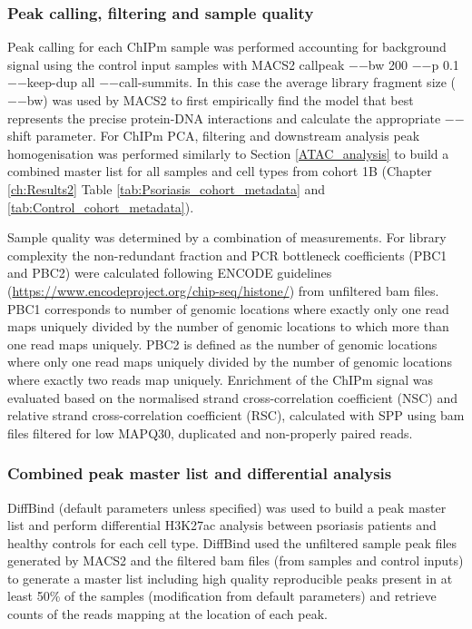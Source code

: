 \subsubsection{Peak calling, filtering and sample quality}
\label{ChIP_qc}
Peak calling for each ChIPm sample was performed accounting for background signal using the control input samples with MACS2 callpeak $-$$-$bw 200 $-$$-$p 0.1 $-$$-$keep-dup all $-$$-$call-summits. In this case the average library fragment size ($-$$-$bw) was used by MACS2 to first empirically find the model that best represents the precise protein-DNA interactions and calculate the appropriate $-$$-$shift parameter. For ChIPm PCA, filtering and downstream analysis peak homogenisation was performed similarly to Section \ref{ATAC_analysis} to build a combined master list for all samples and cell types from cohort 1B (Chapter \ref{ch:Results2} Table \ref{tab:Psoriasis_cohort_metadata} and \ref{tab:Control_cohort_metadata}).

Sample quality was determined by a combination of measurements. For library complexity the non-redundant fraction and PCR bottleneck coefficients (PBC1 and PBC2) were calculated following ENCODE guidelines (\url{https://www.encodeproject.org/chip-seq/histone/}) from unfiltered bam files. PBC1 corresponds to number of genomic locations where exactly only one read maps uniquely divided by the number of genomic locations to which more than one read maps uniquely. PBC2 is defined as the number of genomic locations where only one read maps uniquely divided by the number of genomic locations where exactly two reads map uniquely. Enrichment of the ChIPm signal was evaluated based on the normalised strand cross-correlation coefficient (NSC) and relative strand cross-correlation coefficient (RSC), calculated with SPP using bam files filtered for low MAPQ30, duplicated and non-properly paired reads.




\subsubsection{Combined peak master list and differential analysis}
DiffBind (default parameters unless specified) was used to build a peak master list and perform differential H3K27ac analysis between psoriasis patients and healthy controls for each cell type. DiffBind used the unfiltered sample peak files generated by MACS2 and the filtered bam files (from samples and control inputs) to generate a master list including high quality reproducible peaks present in at least 50\% of the samples (modification from default parameters) and retrieve counts of the reads mapping at the location of each peak.



